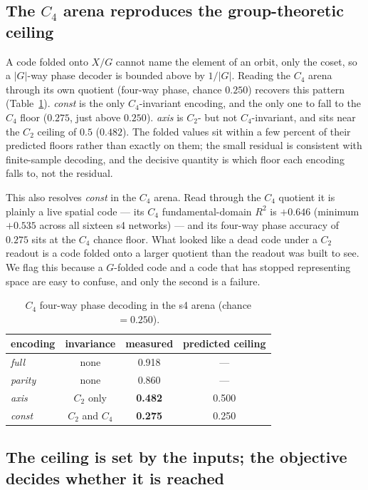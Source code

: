 \documentclass[9pt,lineno]{elife}
\begin{document}
\subsection{The $C_4$ arena reproduces the group-theoretic ceiling}

A code folded onto $X/G$ cannot name the element of an orbit, only the coset, so a $|G|$-way
phase decoder is bounded above by $1/|G|$. Reading the $C_4$ arena through its own quotient
(four-way phase, chance $0.250$) recovers this pattern (Table~\ref{tab:c4}). \textit{const} is
the only $C_4$-invariant encoding, and the only one to fall to the $C_4$ floor ($0.275$, just
above $0.250$). \textit{axis} is $C_2$- but not $C_4$-invariant, and sits near the $C_2$ ceiling
of $0.5$ ($0.482$). The folded values sit within a few percent of their predicted floors rather
than exactly on them; the small residual is consistent with finite-sample decoding, and the
decisive quantity is which floor each encoding falls to, not the residual.

This also resolves \textit{const} in the $C_4$ arena. Read through the $C_4$ quotient it is
plainly a live spatial code --- its $C_4$ fundamental-domain $R^2$ is $+0.646$ (minimum $+0.535$
across all sixteen s4 networks) --- and its four-way phase accuracy of $0.275$ sits at the $C_4$
chance floor. What looked like a dead code under a $C_2$ readout is a code folded onto a larger
quotient than the readout was built to see. We flag this because a $G$-folded code and a code
that has stopped representing space are easy to confuse, and only the second is a failure.

\begin{table}[t]
\centering
\caption{$C_4$ four-way phase decoding in the s4 arena (chance $= 0.250$).}
\label{tab:c4}
\begin{tabular}{lccc}
\toprule
encoding & invariance & measured & predicted ceiling \\
\midrule
\textit{full}   & none          & 0.918 & --- \\
\textit{parity} & none          & 0.860 & --- \\
\textit{axis}   & $C_2$ only    & \textbf{0.482} & 0.500 \\
\textit{const}  & $C_2$ and $C_4$ & \textbf{0.275} & 0.250 \\
\bottomrule
\end{tabular}
\end{table}

\subsection{The ceiling is set by the inputs; the objective decides whether it is reached}
\end{document}
